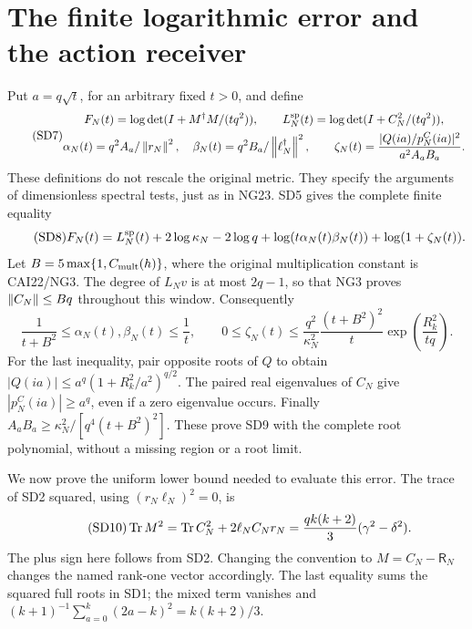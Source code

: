 \documentclass[11pt]{article}
\begin{document}
\section{The finite logarithmic error and the action receiver}
Put $a=q\sqrt t$, for an arbitrary fixed $t>0$, and define
\begin{equation}\tag{SD7}
\begin{gathered}
F_N(t)=\log\det(I+M^\dagger M/(tq^2)),\qquad
L_N^{\rm sp}(t)=\log\det(I+C_N^2/(tq^2)),\\
\alpha_N(t)=q^2 A_a/\left\lVert r_N\right\rVert^2,\quad
\beta_N(t)=q^2 B_a/\left\lVert\ell_N^\dagger\right\rVert^2,\qquad
\zeta_N(t)=\frac{|Q(ia)/p_N^C(ia)|^2}{a^2A_aB_a}.
\end{gathered}
\end{equation}
These definitions do not rescale the original metric. They specify the
arguments of dimensionless spectral tests, just as in NG23.
SD5 gives the complete finite equality
\begin{equation}\tag{SD8}
F_N(t)=L_N^{\rm sp}(t)+2\log\kappa_N-2\log q
+\log(t\alpha_N(t)\beta_N(t))+\log(1+\zeta_N(t)).
\end{equation}
Let $B=5\max\{1,C_{\rm mult}(h)\}$, where the original multiplication
constant is CAI22/NG3. The degree of $L_Nv$ is at most $2q-1$, so that
NG3 proves $\left\lVert C_N\right\rVert\le Bq$ throughout this window. Consequently
\begin{equation}\tag{SD9}
\frac1{t+B^2}\le\alpha_N(t),\beta_N(t)\le\frac1t,
\qquad
0\le\zeta_N(t)\le
\frac{q^2}{\kappa_N^2}\frac{(t+B^2)^2}{t}
\exp\!\left(\frac{R_k^2}{tq}\right).
\end{equation}
For the last inequality, pair opposite roots of $Q$ to obtain
$|Q(ia)|\le a^q(1+R_k^2/a^2)^{q/2}$. The paired real eigenvalues of
$C_N$ give $|p_N^C(ia)|\ge a^q$, even if a zero eigenvalue occurs.
Finally $A_aB_a\ge\kappa_N^2/[q^4(t+B^2)^2]$. These prove SD9 with
the complete root polynomial, without a missing region or a root limit.

We now prove the uniform lower bound needed to evaluate this error.
The trace of SD2 squared, using $(r_N\ell_N)^2=0$, is
\begin{equation}\tag{SD10}
\operatorname{Tr} M^2=\operatorname{Tr} C_N^2+2\ell_N C_Nr_N
=\frac{qk(k+2)}3(\gamma^2-\delta^2).
\end{equation}
The plus sign here follows from SD2. Changing the convention to
$M=C_N-\mathsf R_N$ changes the named rank-one vector accordingly.
The last equality sums the squared full roots in SD1; the mixed term
vanishes and $(k+1)^{-1}\sum_{a=0}^k(2a-k)^2=k(k+2)/3$.
\end{document}
